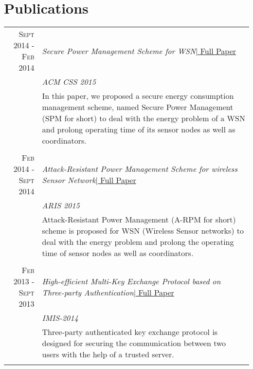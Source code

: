 \documentclass[a4paper,10pt]{article}
\begin{document}
\section{Publications}
\begin{tabular}{r|p{10.3cm}}

 \textsc{Sept 2014 - Feb 2014} & \emph{Secure Power Management Scheme for WSN}\href{run:Paper-Secure Power Management Scheme for WSN.pdf}{\hspace{63pt}| \footnotesize Full Paper}\\
  &\emph{ACM CSS 2015}\\
 &\footnotesize{In this paper, we proposed a secure energy consumption management scheme, named Secure Power Management (SPM for short) to deal with the energy problem of a WSN and prolong operating time of its sensor nodes as well as coordinators.}\\\multicolumn{2}{c}{} \\
 
 \textsc{Feb 2014 - Sept 2014} & \emph{Attack-Resistant Power Management Scheme for wireless Sensor Network}\href{run:Paper-Attack-Resistant Power Management Scheme for wireless Sensor Network.pdf}{\hspace{232pt}| \footnotesize Full Paper}\\
  &\emph{ARIS 2015}\\
 &\footnotesize{Attack-Resistant Power
Management (A-RPM for short) scheme is proposed for WSN (Wireless Sensor networks) to deal with the energy problem and prolong the operating time of sensor nodes as well as coordinators.}\\\multicolumn{2}{c}{} \\
 
\textsc{Feb 2013 - Sept 2013} & \emph{High-efficient Multi-Key Exchange Protocol based on Three-party Authentication}\href{run:Paper-High-efficient Multi-Key Exchange Protocol based on Three-party Authentication.pdf.pdf}{\hspace{202pt}| \footnotesize Full Paper}\\
 &\emph{IMIS-2014}\\
&\footnotesize{Three-party authenticated key exchange protocol is designed for securing the communication between two
users with the help of a trusted server.}\\\multicolumn{2}{c}{} \\
 
\end{tabular}
 
\end{document}

